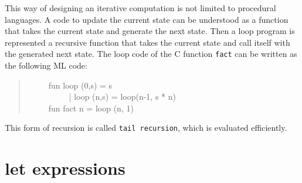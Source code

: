 \documentclass{jbook}
\newcommand{\txt}[2]{#2}
\newcommand{\myem}{\ \ \ \ \  }
\begin{document}
	This way of designing an iterative computation is not limited to
procedural languages.
	A code to update the current state can be understood as a
function that takes the current state and generate the next state.
	Then a loop program is represented a recursive function that
takes the current state and call itself with the generated next state.
	The loop code of the C function {\tt fact} can be written as
the following ML code:
\begin{tt}
\begin{quote}
\myem  fun loop (0,s) = s\\
\myem \ \ \ \ \    | loop (n,s) = loop(n-1, s * n)\\
\myem fun fact n = loop (n, 1)
\end{quote}
\end{tt}
	This form of recursion is called {\tt tail recursion}, which is
evaluated efficiently.
\fi%

\section{\txt{let式}{let expressions}}
\label{sec:tutorialLetexpression}
\end{document}
